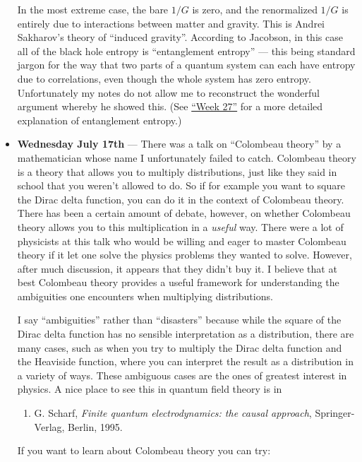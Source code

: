 \documentclass{article}
\def\tightlist{}
\begin{document}
\begin{itemize}
  In the most extreme case, the bare \(1/G\) is zero, and the
  renormalized \(1/G\) is entirely due to interactions between matter
  and gravity. This is Andrei Sakharov's theory of ``induced gravity''.
  According to Jacobson, in this case all of the black hole entropy is
  ``entanglement entropy'' --- this being standard jargon for the way
  that two parts of a quantum system can each have entropy due to
  correlations, even though the whole system has zero entropy.
  Unfortunately my notes do not allow me to reconstruct the wonderful
  argument whereby he showed this. (See
  \protect\hyperlink{week27}{``Week 27''} for a more detailed
  explanation of entanglement entropy.)
\item
  \textbf{Wednesday July 17th} --- There was a talk on ``Colombeau
  theory'' by a mathematician whose name I unfortunately failed to
  catch. Colombeau theory is a theory that allows you to multiply
  distributions, just like they said in school that you weren't allowed
  to do. So if for example you want to square the Dirac delta function,
  you can do it in the context of Colombeau theory. There has been a
  certain amount of debate, however, on whether Colombeau theory allows
  you to this multiplication in a \emph{useful} way. There were a lot of
  physicists at this talk who would be willing and eager to master
  Colombeau theory if it let one solve the physics problems they wanted
  to solve. However, after much discussion, it appears that they didn't
  buy it. I believe that at best Colombeau theory provides a useful
  framework for understanding the ambiguities one encounters when
  multiplying distributions.

  I say ``ambiguities'' rather than ``disasters'' because while the
  square of the Dirac delta function has no sensible interpretation as a
  distribution, there are many cases, such as when you try to multiply
  the Dirac delta function and the Heaviside function, where you can
  interpret the result as a distribution in a variety of ways. These
  ambiguous cases are the ones of greatest interest in physics. A nice
  place to see this in quantum field theory is in

  \begin{enumerate}
  \def\labelenumi{\arabic{enumi})}
  \tightlist
  \item
    G. Scharf, \emph{Finite quantum electrodynamics: the causal
    approach}, Springer-Verlag, Berlin, 1995.
  \end{enumerate}

  If you want to learn about Colombeau theory you can try:


\end{itemize}
\end{document}
